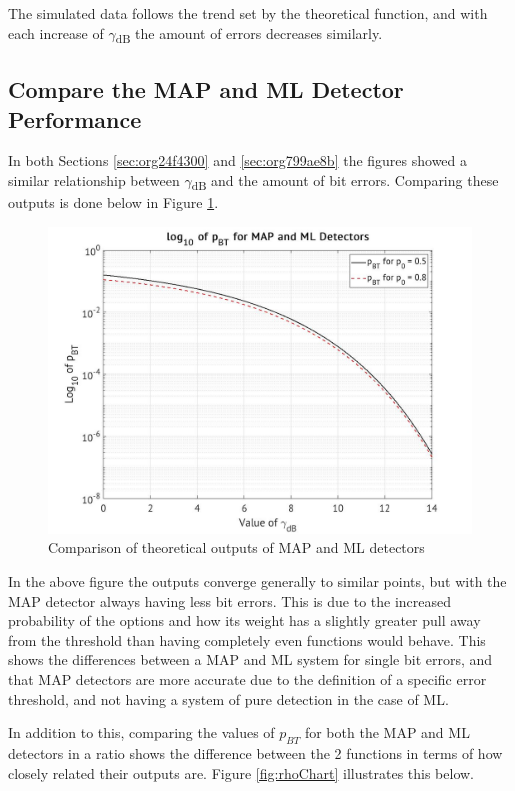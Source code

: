 \documentclass[a4paper, 11pt]{article}
\begin{document}
The simulated data follows the trend set by the theoretical function, and with each increase of \(\gamma\)\textsubscript{dB} the amount of errors decreases similarly.

\subsection{Compare the MAP and ML Detector Performance}
\label{sec:orgdc2cb0d}
In both Sections \ref{sec:org24f4300} and \ref{sec:org799ae8b} the figures showed a similar relationship between \(\gamma\)\textsubscript{dB} and the amount of bit errors. Comparing these outputs is done below in Figure \ref{fig:MAPMLcomp}.

\pagebreak
\begin{figure}[htbp]
\centering
\includegraphics[width=.9\linewidth]{./Images/figure2_5a.jpg}
\caption{\label{fig:MAPMLcomp}Comparison of theoretical outputs of MAP and ML detectors}
\end{figure}

In the above figure the outputs converge generally to similar points, but with the MAP detector always having less bit errors. This is due to the increased probability of the options and how its weight has a slightly greater pull away from the threshold than having completely even functions would behave.
This shows the differences between a MAP and ML system for single bit errors, and that MAP detectors are more accurate due to the definition of a specific error threshold, and not having a system of pure detection in the case of ML.

\medskip

In addition to this, comparing the values of \(p_{BT}\) for both the MAP and ML detectors in a ratio shows the difference between the 2 functions in terms of how closely related their outputs are.
Figure \ref{fig:rhoChart} illustrates this below.
\end{document}
